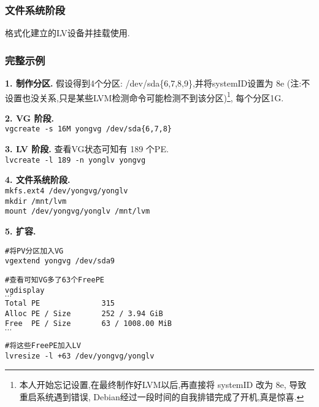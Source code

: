 \subsubsection{文件系统阶段}
格式化建立的LV设备并挂载使用.

\subsubsection{完整示例}
\par
\textbf{1. 制作分区.} 假设得到4个分区: /dev/sda\{6,7,8,9\},并将systemID设置为 8e (注:不设置也没关系,只是某些LVM检测命令可能检测不到该分区)\footnote[2]{本人开始忘记设置,在最终制作好LVM以后,再直接将 systemID 改为 8e, 导致重启系统遇到错误, Debian经过一段时间的自我排错完成了开机,真是惊喜.}, 每个分区1G.

\par
\textbf{2. VG 阶段.}\\
\indent\texttt{\qquad vgcreate -s 16M yongvg /dev/sda\{6,7,8\}}

\par
\textbf{3. LV 阶段.} 查看VG状态可知有 189 个PE.\\
\indent\texttt{\qquad lvcreate -l 189 -n yonglv yongvg}

\par
\textbf{4. 文件系统阶段.} \\
\indent\texttt{\qquad mkfs.ext4 /dev/yongvg/yonglv}\\
\indent\texttt{\qquad mkdir /mnt/lvm}\\
\indent\texttt{\qquad mount /dev/yongvg/yonglv /mnt/lvm}

\par
\textbf{5. 扩容.} 
\par
\qquad\verb"#将PV分区加入VG"\\
\indent\texttt{\qquad vgextend yongvg /dev/sda9}

\par
\qquad\verb"#查看可知VG多了63个FreePE"\\
\indent\texttt{\qquad vgdisplay} \\
\indent\qquad\qquad$\cdots$\\
\indent\qquad\qquad\verb"Total PE              315"\\
\indent\qquad\qquad\verb"Alloc PE / Size       252 / 3.94 GiB"\\
\indent\qquad\qquad\verb"Free  PE / Size       63 / 1008.00 MiB"\\
\indent\qquad\qquad$\cdots$

\par
\qquad\verb"#将这些FreePE加入LV"\\
\indent\texttt{\qquad lvresize -l +63 /dev/yongvg/yonglv}

